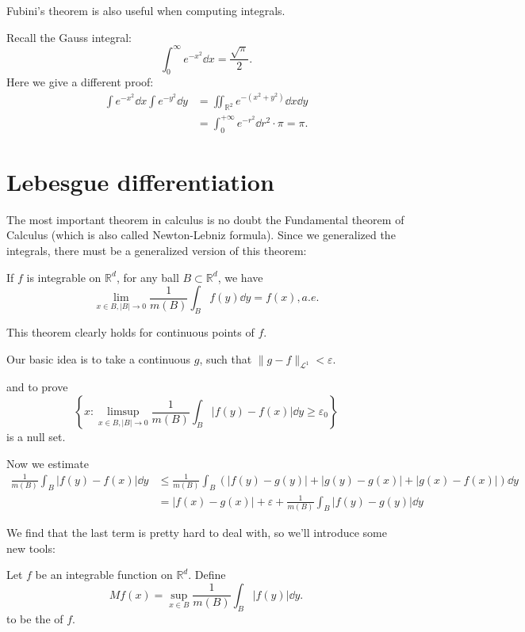 Fubini's theorem is also useful when computing integrals.
\begin{example}
	Recall the Gauss integral:
	\[
	\int_0^\infty e^{-x^2}\dd x = \frac{\sqrt{\pi}}{2}.
	\]
	Here we give a different proof:
	\begin{align*}
		\int e^{-x^2}\dd x \int e^{-y^2}\dd y
		&= \iint_{\mathbb{R}^2} e^{-(x^2+y^2)}\dd x\dd y\\
		&= \int_{0}^{+\infty} e^{-r^2} \dd r^2 \cdot \pi = \pi.
	\end{align*}
\end{example}

\section{Lebesgue differentiation}
\label{sec:Lebesgue differentiation}

The most important theorem in calculus is no doubt the
Fundamental theorem of Calculus (which is also called Newton-Lebniz formula).
Since we generalized the integrals,
there must be a generalized version of this theorem:
\begin{theorem}
	If $f$ is integrable on $\mathbb{R}^d$,
	for any ball $B \subset \mathbb{R}^d$, we have
	\[
	\lim_{x\in B, |B|\to 0}\frac{1}{m(B)} \int_B f(y)\dd y = f(x), a.e.
	\]
\end{theorem}
This theorem clearly holds for continuous points of $f$.

Our basic idea is to take a continuous  $g$, such that
$\lVert g-f \rVert_{\mathcal{L}^1} <\varepsilon$.

and to prove
\[
\left\{x:
\limsup_{x\in B, |B|\to 0} \frac{1}{m(B)}\int_B|f(y)-f(x)|\dd y \ge \varepsilon_0
\right\}
\]
is a null set.

Now we estimate
\begin{align*}
    \frac{1}{m(B)}\int_B |f(y)-f(x)|\dd y
	&\le \frac{1}{m(B)}\int _B \left( |f(y)-g(y)|+|g(y)-g(x)|+|g(x)-f(x)| \right)\dd y
	\\
	&= |f(x)-g(x)| + \varepsilon + \frac{1}{m(B)}\int_B |f(y)-g(y)|\dd y
\end{align*}

We find that the last term is pretty hard to deal with,
so we'll introduce some new tools:
\begin{definition}
	Let $f$ be an integrable function on  $\mathbb{R}^d$. Define
	\[
	Mf(x) = \sup_{x\in B}\frac{1}{m(B)}\int_B |f(y)|\dd y.
	\]
	to be the  of $f$.
\end{definition}

